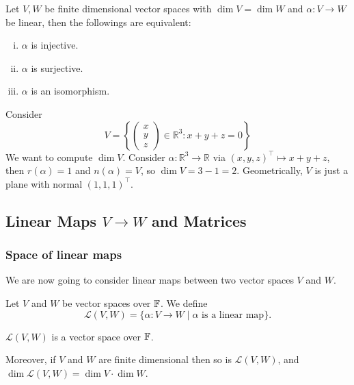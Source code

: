 \documentclass[a4paper]{article}
\begin{document}
\begin{corollary}
    Let $V,W$ be finite dimensional vector spaces with $\dim V=\dim W$ and $\alpha:V\to W$ be linear, then the followings are equivalent:
    \begin{enumerate}[(i)]
        \item $\alpha$ is injective.
        \item $\alpha$ is surjective.
        \item $\alpha$ is an isomorphism.
    \end{enumerate}
\end{corollary}
\begin{example}
    Consider
    $$V=\left\{ \begin{pmatrix}
        x\\
        y\\
        z
    \end{pmatrix}\in\mathbb R^3:x+y+z=0\right\}$$
    We want to compute $\dim V$.
    Consider $\alpha:\mathbb R^3\to\mathbb R$ via $(x,y,z)^\top\mapsto x+y+z$, then $r(\alpha)=1$ and $n(\alpha)=V$, so $\dim V=3-1=2$.
    Geometrically, $V$ is just a plane with normal $(1,1,1)^\top$.
\end{example}

\subsection{Linear Maps \texorpdfstring{$V \rightarrow W$}{V to W} and Matrices}
\subsubsection*{Space of linear maps}
We are now going to consider linear maps between two vector spaces $V$ and $W$.

\begin{definition}
    Let $V$ and $W$ be vector spaces over ${\mathbb{F}}$. We define
    $$
    \mathcal{L}(V, W) = \{\alpha: V \rightarrow W \mid \alpha \text{ is a linear map}\}.
    $$
\end{definition}
\begin{proposition}
    $\mathcal{L}(V, W)$ is a vector space over ${\mathbb{F}}$.
    
    Moreover, if $V$ and $W$ are finite dimensional then so is $\mathcal{L}(V, W)$, and $\dim \mathcal{L}(V, W) = \dim V \cdot \dim W$.
\end{proposition}
\end{document}
